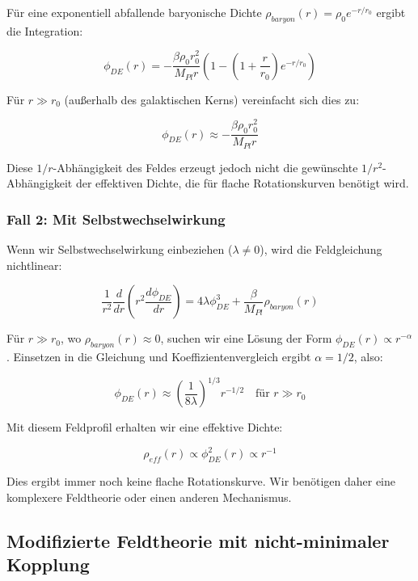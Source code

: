 \documentclass[a4paper,12pt]{article}
\begin{document}
	Für eine exponentiell abfallende baryonische Dichte $\rho_{baryon}(r) = \rho_0 e^{-r/r_0}$ ergibt die Integration:
	
	\begin{equation}
		\phi_{DE}(r) = -\frac{\beta\rho_0 r_0^2}{M_{Pl}r}(1 - (1 + \frac{r}{r_0})e^{-r/r_0})
	\end{equation}
	
	Für $r \gg r_0$ (außerhalb des galaktischen Kerns) vereinfacht sich dies zu:
	
	\begin{equation}
		\phi_{DE}(r) \approx -\frac{\beta\rho_0 r_0^2}{M_{Pl}r}
	\end{equation}
	
	Diese $1/r$-Abhängigkeit des Feldes erzeugt jedoch nicht die gewünschte $1/r^2$-Abhängigkeit der effektiven Dichte, die für flache Rotationskurven benötigt wird.
	
	\subsubsection{Fall 2: Mit Selbstwechselwirkung}
	
	Wenn wir Selbstwechselwirkung einbeziehen ($\lambda \neq 0$), wird die Feldgleichung nichtlinear:
	
	\begin{equation}
		\frac{1}{r^2}\frac{d}{dr}\left(r^2\frac{d\phi_{DE}}{dr}\right) = 4\lambda\phi_{DE}^3 + \frac{\beta}{M_{Pl}}\rho_{baryon}(r)
	\end{equation}
	
	Für $r \gg r_0$, wo $\rho_{baryon}(r) \approx 0$, suchen wir eine Lösung der Form $\phi_{DE}(r) \propto r^{-\alpha}$. Einsetzen in die Gleichung und Koeffizientenvergleich ergibt $\alpha = 1/2$, also:
	
	\begin{equation}
		\phi_{DE}(r) \approx \left(\frac{1}{8\lambda}\right)^{1/3} r^{-1/2} \quad \text{für } r \gg r_0
	\end{equation}
	
	Mit diesem Feldprofil erhalten wir eine effektive Dichte:
	
	\begin{equation}
		\rho_{eff}(r) \propto \phi_{DE}^2(r) \propto r^{-1}
	\end{equation}
	
	Dies ergibt immer noch keine flache Rotationskurve. Wir benötigen daher eine komplexere Feldtheorie oder einen anderen Mechanismus.
	
	\subsection{Modifizierte Feldtheorie mit nicht-minimaler Kopplung}
	
\end{document}
